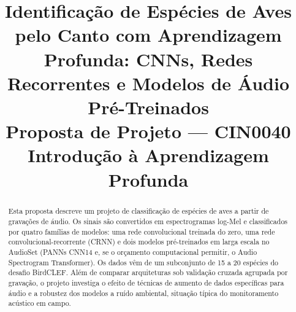 \documentclass[conference]{IEEEtran}
\begin{document}
\title{Identificação de Espécies de Aves pelo Canto com Aprendizagem Profunda: CNNs, Redes Recorrentes e Modelos de Áudio Pré-Treinados\\[4pt]
\large Proposta de Projeto --- CIN0040 Introdução à Aprendizagem Profunda}

\author{
\and
{}
\and
{}
}

\maketitle

\begin{abstract}
Esta proposta descreve um projeto de classificação de espécies de aves a partir de gravações de áudio. Os sinais são convertidos em espectrogramas log-Mel e classificados por quatro famílias de modelos: uma rede convolucional treinada do zero, uma rede convolucional-recorrente (CRNN) e dois modelos pré-treinados em larga escala no AudioSet (PANNs CNN14 e, se o orçamento computacional permitir, o Audio Spectrogram Transformer). Os dados vêm de um subconjunto de 15 a 20 espécies do desafio BirdCLEF. Além de comparar arquiteturas sob validação cruzada agrupada por gravação, o projeto investiga o efeito de técnicas de aumento de dados específicas para áudio e a robustez dos modelos a ruído ambiental, situação típica do monitoramento acústico em campo.
\end{abstract}
\end{document}
